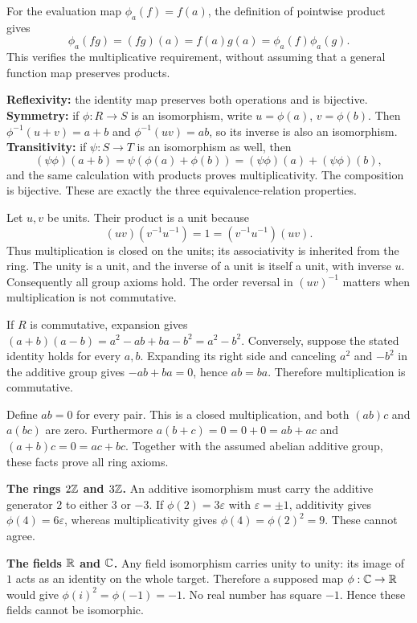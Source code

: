 For the evaluation map $\phi_a(f)=f(a)$, the definition of pointwise product gives
\[\phi_a(fg)=(fg)(a)=f(a)g(a)=\phi_a(f)\phi_a(g).
\]
This verifies the multiplicative requirement, without assuming that a general function map preserves products.

\textbf{Reflexivity:} the identity map preserves both operations and is bijective. \textbf{Symmetry:} if $\phi:R\to S$ is an isomorphism, write $u=\phi(a)$, $v=\phi(b)$. Then $\phi^{-1}(u+v)=a+b$ and $\phi^{-1}(uv)=ab$, so its inverse is also an isomorphism. \textbf{Transitivity:} if $\psi:S\to T$ is an isomorphism as well, then
\[(\psi\phi)(a+b)=\psi(\phi(a)+\phi(b))=(\psi\phi)(a)+(\psi\phi)(b),
\]
and the same calculation with products proves multiplicativity. The composition is bijective. These are exactly the three equivalence-relation properties.

Let $u,v$ be units. Their product is a unit because
\[(uv)(v^{-1}u^{-1})=1=(v^{-1}u^{-1})(uv).
\]
Thus multiplication is closed on the units; its associativity is inherited from the ring. The unity is a unit, and the inverse of a unit is itself a unit, with inverse $u$. Consequently all group axioms hold. The order reversal in $(uv)^{-1}$ matters when multiplication is not commutative.

If $R$ is commutative, expansion gives $(a+b)(a-b)=a^2-ab+ba-b^2=a^2-b^2$. Conversely, suppose the stated identity holds for every $a,b$. Expanding its right side and canceling $a^2$ and $-b^2$ in the additive group gives $-ab+ba=0$, hence $ab=ba$. Therefore multiplication is commutative.

Define $ab=0$ for every pair. This is a closed multiplication, and both $(ab)c$ and $a(bc)$ are zero. Furthermore $a(b+c)=0=0+0=ab+ac$ and $(a+b)c=0=ac+bc$. Together with the assumed abelian additive group, these facts prove all ring axioms.

\textbf{The rings $2\mathbb{Z}$ and $3\mathbb{Z}$.} An additive isomorphism must carry the additive generator $2$ to either $3$ or $-3$. If $\phi(2)=3\varepsilon$ with $\varepsilon=\pm1$, additivity gives $\phi(4)=6\varepsilon$, whereas multiplicativity gives $\phi(4)=\phi(2)^2=9$. These cannot agree.\par
\textbf{The fields $\mathbb{R}$ and $\mathbb{C}$.} Any field isomorphism carries unity to unity: its image of $1$ acts as an identity on the whole target. Therefore a supposed map $\phi:\mathbb{C}\to\mathbb{R}$ would give $\phi(i)^2=\phi(-1)=-1$. No real number has square $-1$. Hence these fields cannot be isomorphic.

